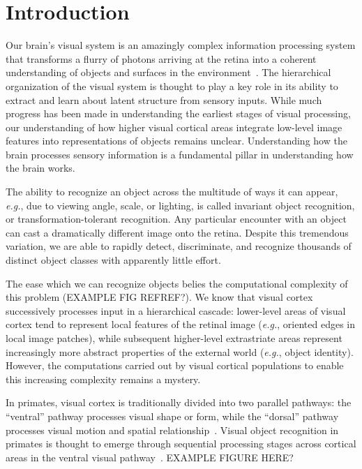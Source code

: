 \chapter{Introduction}
\label{introduction}

Our brain's visual system is an amazingly complex information processing system that transforms a flurry of photons arriving at the retina into a coherent understanding of objects and surfaces in the environment~\cite{DiCarlo2007, Cox2014}. The hierarchical organization of the visual system is thought to play a key role in its ability to extract and learn about latent structure from sensory inputs. While much progress has been made in understanding the earliest stages of visual processing, our understanding of how higher visual cortical areas integrate low-level image features into representations of objects remains unclear. Understanding how the brain processes sensory information is a fundamental pillar in understanding how the brain works. 

The ability to recognize an object across the multitude of ways it can appear, \textit{e.g.}, due to viewing angle, scale, or lighting, is called invariant object recognition, or transformation-tolerant recognition. Any particular encounter with an object can cast a dramatically different image onto the retina. Despite this tremendous variation, we are able to rapidly detect, discriminate, and recognize thousands of distinct object classes with apparently little effort. 

The ease which we can recognize objects belies the computational complexity of this problem (EXAMPLE FIG REFREF?). We know that visual cortex successively processes input in a hierarchical cascade: lower-level areas of visual cortex tend to represent local features of the retinal image (\textit{e.g.}, oriented edges in local image patches), while subsequent higher-level extrastriate areas represent increasingly more abstract properties of the external world (\textit{e.g.}, object identity). However, the computations carried out by visual cortical populations to enable this increasing complexity remains a mystery.

In primates, visual cortex is traditionally divided into two parallel pathways: the “ventral” pathway processes visual shape or form, while the “dorsal” pathway processes visual motion and spatial relationship~\cite{REFREF}. Visual object recognition in primates is thought to emerge through sequential processing stages across cortical areas in the ventral visual pathway~\cite{Rust2010SelectivityIT, DiCarlo2007, DiCarlo2012, Chen2014}.  EXAMPLE FIGURE HERE?

